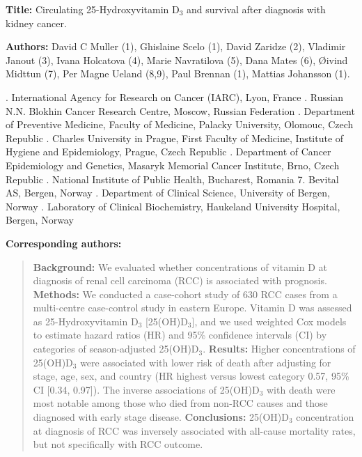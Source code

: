 \documentclass[a4paper,11pt]{article}
\begin{document}
\doublespace
\noindent \textbf{Title:} Circulating 25-Hydroxyvitamin D$_3$ and 
survival after diagnosis with kidney cancer. 

\noindent \textbf{Authors:} David C Muller (1), Ghislaine Scelo (1),  David 
Zaridze (2), Vladimir Janout (3), Ivana Holcatova (4), Marie Navratilova (5), 
Dana Mates (6), {\O}ivind Midttun (7), Per Magne Ueland (8,9), Paul Brennan (1), 
Mattias Johansson (1).

{\footnotesize 
{}. International Agency for Research on Cancer (IARC), Lyon, France . Russian N.N. Blokhin Cancer Research Centre, Moscow, Russian Federation 
. Department of Preventive Medicine, Faculty of Medicine, Palacky University, 
Olomouc, Czech Republic . Charles University in Prague, First Faculty of Medicine, Institute of 
Hygiene 
and Epidemiology, Prague, Czech Republic . Department of Cancer Epidemiology and Genetics, Masaryk Memorial Cancer 
Institute, Brno, Czech Republic . National Institute of Public Health, Bucharest, Romania
7. Bevital AS, Bergen, Norway . Department of Clinical Science, University of Bergen, Norway . Laboratory of Clinical Biochemistry, Haukeland University Hospital, Bergen, 
Norway
}

\textbf{Corresponding authors:} 




\begin{abstract}
\noindent \textbf{Background:} We evaluated whether concentrations of vitamin 
D at diagnosis of renal cell carcinoma (RCC) is associated with prognosis.  
\newline 
\textbf{Methods:} We conducted a case-cohort study of 630 RCC cases from a 
multi-centre case-control study in eastern Europe. Vitamin D was assessed as 
25-Hydroxyvitamin D$_3$ [25(OH)D$_3$], and we used weighted Cox models to estimate 
hazard ratios (HR) and 95\% confidence intervals (CI) by categories of 
season-adjusted 25(OH)D$_3$.\newline 
\textbf{Results:} Higher concentrations of 25(OH)D$_3$ 
were associated with lower risk of death after adjusting for stage, age, sex, 
and country (HR highest versus lowest category 0.57, 95\% CI [0.34, 0.97]). The 
inverse associations of 25(OH)D$_3$ with death were most notable among those who 
died from non-RCC causes and those diagnosed with early stage disease. 
\newline 
\textbf{Conclusions:} 25(OH)D$_3$ concentration at diagnosis 
of RCC was inversely associated with all-cause mortality rates, but not specifically 
with RCC outcome. \newline

\end{abstract}
\end{document}
